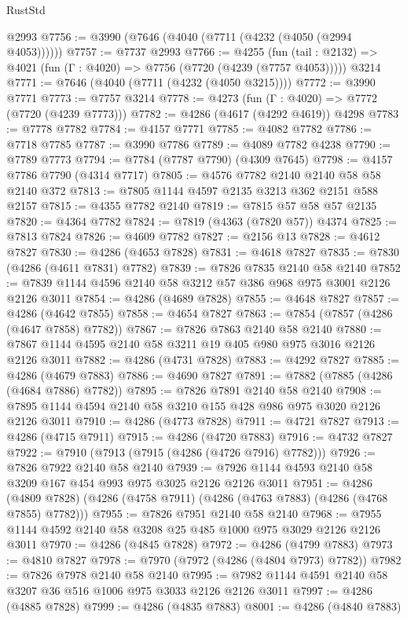 \begin{lexlean}{RustStd}
\begin{coremodule}
    @2993
@7756 := @3990 (@7646 (@4040 (@7711 (@4232 (@4050 (@2994 @4053))))))
@7757 := @7737 @2993
@7766 := @4255
    (fun (tail : @2132) => @4021 (fun (Γ : @4020) => @7756 (@7720 (@4239 (@7757 @4053)))))
    @3214
@7771 := @7646 (@4040 (@7711 (@4232 (@4050 @3215))))
@7772 := @3990 @7771
@7773 := @7757 @3214
@7778 := @4273 (fun (Γ : @4020) => @7772 (@7720 (@4239 @7773)))
@7782 := @4286 (@4617 (@4292 @4619)) @4298
@7783 := @7778 @7782
@7784 := @4157 @7771
@7785 := @4082 @7782
@7786 := @7718 @7785
@7787 := @3990 @7786
@7789 := @4089 @7782 @4238
@7790 := @7789 @7773
@7794 := @7784 (@7787 @7790) (@4309 @7645)
@7798 := @4157 @7786 @7790 (@4314 @7717)
@7805 := @4576 @7782 @2140 @2140 @58 @58 @2140 @372
@7813 := @7805 @1144 @4597 @2135 @3213 @362 @2151 @588 @2157
@7815 := @4355 @7782 @2140
@7819 := @7815 @57 @58 @57 @2135
@7820 := @4364 @7782
@7824 := @7819 (@4363 (@7820 @57)) @4374
@7825 := @7813 @7824
@7826 := @4609 @7782
@7827 := @2156 @13
@7828 := @4612 @7827
@7830 := @4286 (@4653 @7828)
@7831 := @4618 @7827
@7835 := @7830 (@4286 (@4611 @7831) @7782)
@7839 := @7826 @7835 @2140 @58 @2140
@7852 := @7839 @1144 @4596 @2140 @58 @3212 @57 @386 @968 @975 @3001 @2126 @2126 @3011
@7854 := @4286 (@4689 @7828)
@7855 := @4648 @7827
@7857 := @4286 (@4642 @7855)
@7858 := @4654 @7827
@7863 := @7854 (@7857 (@4286 (@4647 @7858) @7782))
@7867 := @7826 @7863 @2140 @58 @2140
@7880 := @7867 @1144 @4595 @2140 @58 @3211 @19 @405 @980 @975 @3016 @2126 @2126 @3011
@7882 := @4286 (@4731 @7828)
@7883 := @4292 @7827
@7885 := @4286 (@4679 @7883)
@7886 := @4690 @7827
@7891 := @7882 (@7885 (@4286 (@4684 @7886) @7782))
@7895 := @7826 @7891 @2140 @58 @2140
@7908 := @7895 @1144 @4594 @2140 @58 @3210 @155 @428 @986 @975 @3020 @2126 @2126 @3011
@7910 := @4286 (@4773 @7828)
@7911 := @4721 @7827
@7913 := @4286 (@4715 @7911)
@7915 := @4286 (@4720 @7883)
@7916 := @4732 @7827
@7922 := @7910 (@7913 (@7915 (@4286 (@4726 @7916) @7782)))
@7926 := @7826 @7922 @2140 @58 @2140
@7939 := @7926 @1144 @4593 @2140 @58 @3209 @167 @454 @993 @975 @3025 @2126 @2126 @3011
@7951 := @4286 (@4809 @7828) (@4286 (@4758 @7911) (@4286 (@4763 @7883) (@4286 (@4768 @7855) @7782)))
@7955 := @7826 @7951 @2140 @58 @2140
@7968 := @7955 @1144 @4592 @2140 @58 @3208 @25 @485 @1000 @975 @3029 @2126 @2126 @3011
@7970 := @4286 (@4845 @7828)
@7972 := @4286 (@4799 @7883)
@7973 := @4810 @7827
@7978 := @7970 (@7972 (@4286 (@4804 @7973) @7782))
@7982 := @7826 @7978 @2140 @58 @2140
@7995 := @7982 @1144 @4591 @2140 @58 @3207 @36 @516 @1006 @975 @3033 @2126 @2126 @3011
@7997 := @4286 (@4885 @7828)
@7999 := @4286 (@4835 @7883)
@8001 := @4286 (@4840 @7883)

\end{coremodule}
\end{lexlean}
